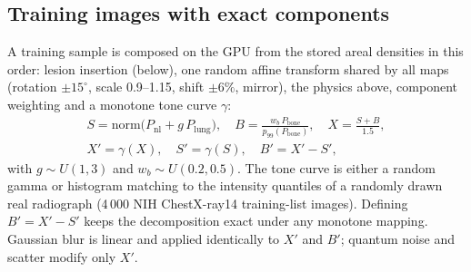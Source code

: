 \subsection{Training images with exact components}
A training sample is composed on the GPU from the stored areal densities in this order: lesion insertion (below), one random affine transform shared by all maps
(rotation $\pm15^\circ$, scale 0.9--1.15, shift $\pm6\%$, mirror), the physics above, component weighting and a monotone tone curve
$\gamma$:
\begin{equation}
\begin{gathered}
S=\mathrm{norm}\big(P_{\mathrm{nl}}+g\,P_{\mathrm{lung}}\big),\quad B=\frac{w_b\,P_{\mathrm{bone}}}{p_{99}(P_{\mathrm{bone}})},\quad
X=\frac{S+B}{1.5},\\
X'=\gamma(X),\quad S'=\gamma(S),\quad B'=X'-S',
\end{gathered}
\label{eq:compose}
\end{equation}
with $g\sim U(1,3)$ and $w_b\sim U(0.2,0.5)$. The tone curve is either a random gamma or histogram matching to the intensity quantiles of a
randomly drawn real radiograph (4\,000 NIH ChestX-ray14 training-list images). Defining $B'=X'-S'$ keeps the decomposition exact under any
monotone mapping. Gaussian blur is linear and applied identically to $X'$ and $B'$; quantum noise and scatter
modify only $X'$.

